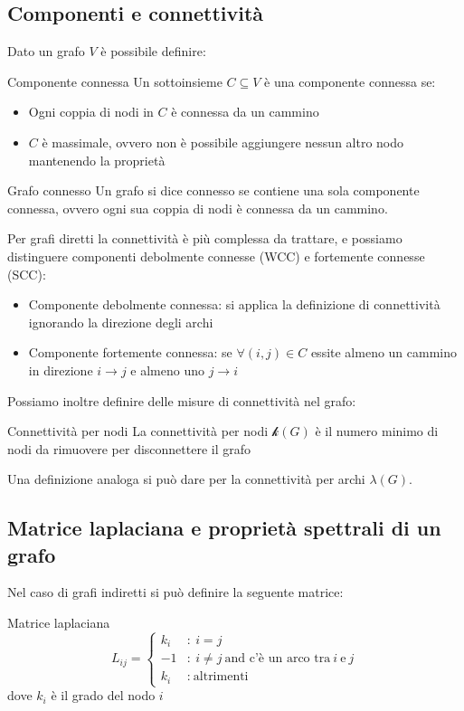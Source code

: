 \subsection{Componenti e connettività}
Dato un grafo $V$ è possibile definire:
\begin{boxb}{Componente connessa}
  Un sottoinsieme $C\subseteq V$ è una componente connessa se:
  \begin{itemize}
   \item Ogni coppia di nodi in $C$ è connessa da un cammino
   \item $C$ è massimale, ovvero non è possibile aggiungere nessun altro nodo mantenendo la proprietà
  \end{itemize}
\end{boxb}
\begin{boxb}{Grafo connesso}
Un grafo si dice connesso se contiene una sola componente connessa, ovvero ogni sua coppia di nodi è connessa da un cammino.
\end{boxb}

Per grafi diretti la connettività è più complessa da trattare, e possiamo distinguere componenti debolmente connesse (WCC) e fortemente connesse (SCC):
\begin{itemize}
  \item Componente debolmente connessa: si applica la definizione di connettività ignorando la direzione degli archi
  \item Componente fortemente connessa: se $\forall (i,j)\in C$ essite almeno un cammino in direzione $i \to j$ e almeno uno $j \to i$
\end{itemize}

Possiamo inoltre definire delle misure di connettività nel grafo:
\begin{boxb}{Connettività per nodi}
  La connettività per nodi $\mathcal{k}(G)$ è il numero minimo di nodi da rimuovere per disconnettere il grafo
\end{boxb}
Una definizione analoga si può dare per la connettività per archi $\lambda(G)$.

\subsection{Matrice laplaciana e proprietà spettrali di un grafo}
Nel caso di grafi indiretti si può definire la seguente matrice:
\begin{boxb}{Matrice laplaciana}
\begin{equation}
  L_{ij}=\left\{ \begin{array}{cl}
k_i & :  \ i =j \\
-1 & :  \ i \not=j \ \text{and c'è un arco tra} \ i \ \text{e}\ j \\
k_i & :  \ \text{altrimenti}
\end{array} \right.
\end{equation}
dove $k_i$ è il grado del nodo $i$
\end{boxb}

